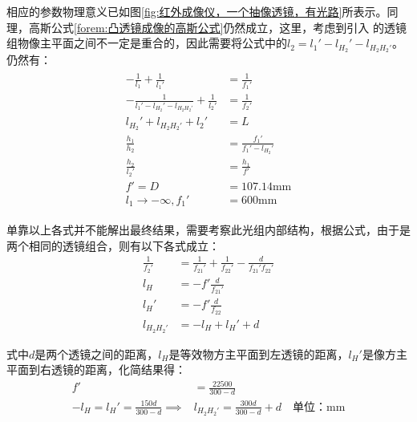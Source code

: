 \documentclass[11pt]{article}
\begin{document}
\par
相应的参数物理意义已如图\ref{fig:红外成像仪，一个抽像透镜，有光路}所表示。同理，高斯公式\ref{forem:凸透镜成像的高斯公式}仍然成立，这里，考虑到引入 的透镜组物像主平面之间不一定是重合的，因此需要将公式中的$l_2=l_1'-l_{H_2}'-l_{H_2H_2'}$。仍然有：
\begin{align}
  \begin{aligned}
    -\frac{1}{l_1}+                       \frac{1}{l_1'}  & =\frac{1}{f_1'}             \\
    -\frac{1}{l_1'-l_{H_2}'-l_{H_2H_2'}}  +\frac{1}{l_2'} & =\frac{1}{f_2'}             \\
    l_{H_2}'+l_{H_2H_2'}                 +l_2'            & =L                          \\
    \frac{h_1}{h_2}                                       & =\frac{f_1'}{f_1'-l_{H_2}'} \\
    \frac{h_2}{l_2'}                                      & =\frac{h_1}{f'}             \\
    f'=D                                                  & =107.14\unit{\mm}           \\
    l_1\rightarrow-\infty,f_1'                            & =600\unit{\mm}
  \end{aligned}
  \label{forem:等效透镜组}
\end{align}
\par
单靠以上各式并不能解出最终结果，需要考察此光组内部结构，根据公式\cite*{optical_engineer}，由于是两个相同的透镜组合，则有以下各式成立：
\begin{align}
  \frac{1}{f_2'} & =\frac{1}{f_{21}'}+\frac{1}{f_{22}'}-\frac{d}{f_{21}'f_{22}'} \\
  l_H            & =-f'\frac{d}{f_{21}'}                                            \\
  l_H'           & =-f'\frac{d}{f_{22}}                                             \\
  l_{H_2H_2'}    & =-l_H+l_H'+d
\end{align}
\par
式中$d$是两个透镜之间的距离，$l_H$是等效物方主平面到左透镜的距离，$l_H'$是像方主平面到右透镜的距离，化简结果得：
\begin{align*}
  f'                                   & =\frac{22500}{300-d}                                      \\
  -l_H=l_H'=\frac{150d}{300-d}\implies & l_{H_2H_2'}=\frac{300d}{300-d}+d\quad\text{单位：}\unit{\mm}
\end{align*}
\end{document}
